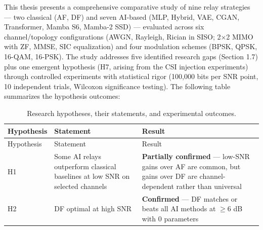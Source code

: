 \documentclass[
  english,
  12pt,
  12pt,
  a4paper,
  oneside]{report}
\begin{document}
This thesis presents a comprehensive comparative study of nine relay strategies --- two classical (AF, DF) and seven AI-based (MLP, Hybrid, VAE, CGAN, Transformer, Mamba S6, Mamba-2 SSD) --- evaluated across six channel/topology configurations (AWGN, Rayleigh, Rician in SISO; 2×2 MIMO with ZF, MMSE, SIC equalization) and four modulation schemes (BPSK, QPSK, 16-QAM, 16-PSK). The study addresses five identified research gaps (Section 1.7) plus one emergent hypothesis (H7, arising from the CSI injection experiments) through controlled experiments with statistical rigor (100,000 bits per SNR point, 10 independent trials, Wilcoxon significance testing). The following table summarizes the hypothesis outcomes:

\begin{longtable}[]{@{}
  >{\raggedright\arraybackslash}p{}
  >{\raggedright\arraybackslash}p{}
  >{\raggedright\arraybackslash}p{}@{}}
\caption{Research hypotheses, their statements, and experimental outcomes.}\label{tbl:table33}\tabularnewline
\toprule\noalign{}
\begin{minipage}[b]{\linewidth}\raggedright
Hypothesis
\end{minipage} & \begin{minipage}[b]{\linewidth}\raggedright
Statement
\end{minipage} & \begin{minipage}[b]{\linewidth}\raggedright
Result
\end{minipage} \\
\midrule\noalign{}
\endfirsthead
\toprule\noalign{}
\begin{minipage}[b]{\linewidth}\raggedright
Hypothesis
\end{minipage} & \begin{minipage}[b]{\linewidth}\raggedright
Statement
\end{minipage} & \begin{minipage}[b]{\linewidth}\raggedright
Result
\end{minipage} \\
\midrule\noalign{}
\endhead
\bottomrule\noalign{}
\endlastfoot
H1 & Some AI relays outperform classical baselines at low SNR on selected channels & \textbf{Partially confirmed} --- low-SNR gains over AF are common, but gains over DF are channel-dependent rather than universal \\
H2 & DF optimal at high SNR & \textbf{Confirmed} --- DF matches or beats all AI methods at \(\geq 6\) dB with 0 parameters \\

\end{longtable}
\end{document}

